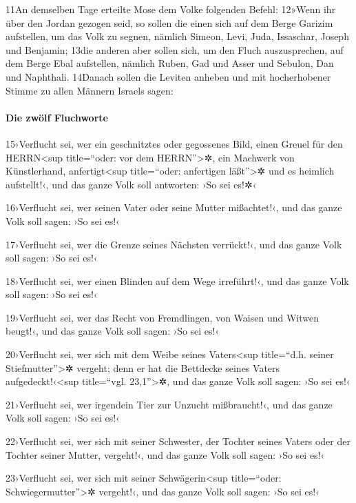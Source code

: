 11An demselben Tage erteilte Mose dem Volke folgenden Befehl: 12»Wenn
ihr über den Jordan gezogen seid, so sollen die einen sich auf dem Berge
Garizim aufstellen, um das Volk zu segnen, nämlich Simeon, Levi, Juda,
Issaschar, Joseph und Benjamin; 13die anderen aber sollen sich, um den
Fluch auszusprechen, auf dem Berge Ebal aufstellen, nämlich Ruben, Gad
und Asser und Sebulon, Dan und Naphthali. 14Danach sollen die Leviten
anheben und mit hocherhobener Stimme zu allen Männern Israels sagen:

\hypertarget{die-zwuxf6lf-fluchworte}{%
\paragraph{Die zwölf Fluchworte}\label{die-zwuxf6lf-fluchworte}}

15›Verflucht sei, wer ein geschnitztes oder gegossenes Bild, einen
Greuel für den HERRN\textless sup title=``oder: vor dem
HERRN''\textgreater✲, ein Machwerk von Künstlerhand,
anfertigt\textless sup title=``oder: anfertigen läßt''\textgreater✲ und
es heimlich aufstellt!‹, und das ganze Volk soll antworten: ›So sei
es!✲‹

16›Verflucht sei, wer seinen Vater oder seine Mutter mißachtet!‹, und
das ganze Volk soll sagen: ›So sei es!‹

17›Verflucht sei, wer die Grenze seines Nächsten verrückt!‹, und das
ganze Volk soll sagen: ›So sei es!‹

18›Verflucht sei, wer einen Blinden auf dem Wege irreführt!‹, und das
ganze Volk soll sagen: ›So sei es!‹

19›Verflucht sei, wer das Recht von Fremdlingen, von Waisen und Witwen
beugt!‹, und das ganze Volk soll sagen: ›So sei es!‹

20›Verflucht sei, wer sich mit dem Weibe seines Vaters\textless sup
title=``d.h. seiner Stiefmutter''\textgreater✲ vergeht; denn er hat die
Bettdecke seines Vaters aufgedeckt!‹\textless sup title=``vgl.
23,1''\textgreater✲, und das ganze Volk soll sagen: ›So sei es!‹

21›Verflucht sei, wer irgendein Tier zur Unzucht mißbraucht!‹, und das
ganze Volk soll sagen: ›So sei es!‹

22›Verflucht sei, wer sich mit seiner Schwester, der Tochter seines
Vaters oder der Tochter seiner Mutter, vergeht!‹, und das ganze Volk
soll sagen: ›So sei es!‹

23›Verflucht sei, wer sich mit seiner Schwägerin\textless sup
title=``oder: Schwiegermutter''\textgreater✲ vergeht!‹, und das ganze
Volk soll sagen: ›So sei es!‹

